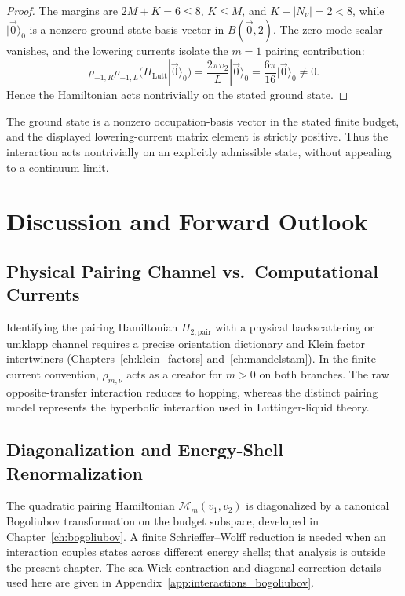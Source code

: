 \begin{proof}
The margins are $2M+K=6\le8$, $K\le M$, and $K+|N_\nu|=2<8$, while $|\vec 0\rangle_0$ is a nonzero ground-state basis vector in $B(\vec 0,2)$. The zero-mode scalar vanishes, and the lowering currents isolate the $m=1$ pairing contribution:
\begin{equation}
\rho_{-1,R}\rho_{-1,L}\bigl(H_{\mathrm{Lutt}}|\vec 0\rangle_0\bigr)=\frac{2\pi v_2}{L}|\vec 0\rangle_0=\frac{6\pi}{16}|\vec 0\rangle_0\ne0.
\end{equation}
Hence the Hamiltonian acts nontrivially on the stated ground state.
\end{proof}

\begin{remark}
The ground state is a nonzero occupation-basis vector in the stated finite budget, and the displayed lowering-current matrix element is strictly positive. Thus the interaction acts nontrivially on an explicitly admissible state, without appealing to a continuum limit.
\end{remark}

\section{Discussion and Forward Outlook}

\subsection{Physical Pairing Channel vs.\ Computational Currents}
\begin{remark}
Identifying the pairing Hamiltonian $H_{2, \mathrm{pair}}$ with a physical backscattering or umklapp channel requires a precise orientation dictionary and Klein factor intertwiners (Chapters~\ref{ch:klein_factors} and~\ref{ch:mandelstam}). In the finite current convention, $\rho_{m, \nu}$ acts as a creator for $m>0$ on both branches. The raw opposite-transfer interaction reduces to hopping, whereas the distinct pairing model represents the hyperbolic interaction used in Luttinger-liquid theory.
\end{remark}

\subsection{Diagonalization and Energy-Shell Renormalization}
\begin{remark}
The quadratic pairing Hamiltonian $\mathcal{M}_m(v_1, v_2)$ is diagonalized by a canonical Bogoliubov transformation on the budget subspace, developed in Chapter~\ref{ch:bogoliubov}. A finite Schrieffer--Wolff reduction is needed when an interaction couples states across different energy shells; that analysis is outside the present chapter. The sea-Wick contraction and diagonal-correction details used here are given in Appendix~\ref{app:interactions_bogoliubov}.
\end{remark}


